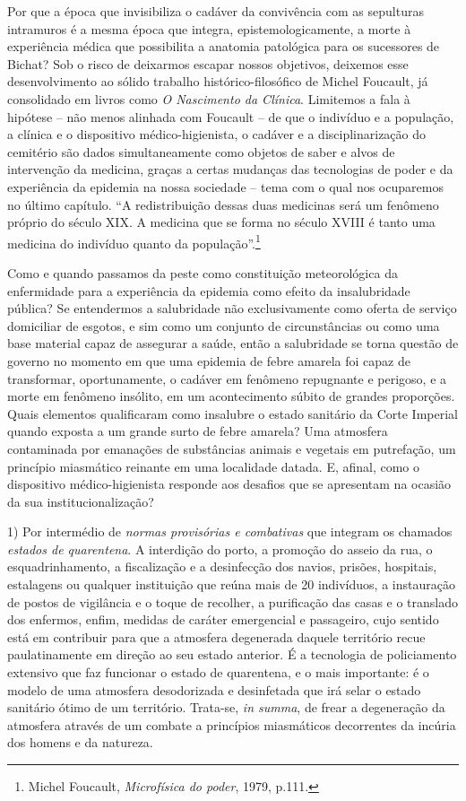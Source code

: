 Por que a época que invisibiliza o cadáver da convivência com as
sepulturas intramuros é a mesma época que integra, epistemologicamente,
a morte à experiência médica que possibilita a anatomia patológica para
os sucessores de Bichat? Sob o risco de deixarmos escapar nossos
objetivos, deixemos esse desenvolvimento ao sólido trabalho
histórico-filosófico de Michel Foucault, já consolidado em livros como
\emph{O Nascimento da Clínica}. Limitemos a fala à hipótese -- não menos
alinhada com Foucault -- de que o indivíduo e a população, a clínica e o
dispositivo médico-higienista, o cadáver e a disciplinarização do
cemitério são dados simultaneamente como objetos de saber e alvos de
intervenção da medicina, graças a certas mudanças das tecnologias de
poder e da experiência da epidemia na nossa sociedade -- tema com o qual
nos ocuparemos no último capítulo. ``A redistribuição dessas duas
medicinas será um fenômeno próprio do século XIX. A medicina que se
forma no século XVIII é tanto uma medicina do indivíduo quanto da
população''.\footnote{Michel Foucault, \emph{Microfísica do poder},
  1979, p.111.}

Como e quando passamos da peste como constituição meteorológica da
enfermidade para a experiência da epidemia como efeito da insalubridade
pública? Se entendermos a salubridade não exclusivamente como oferta de
serviço domiciliar de esgotos, e sim como um conjunto de circunstâncias
ou como uma base material capaz de assegurar a saúde, então a
salubridade se torna questão de governo no momento em que uma epidemia
de febre amarela foi capaz de transformar, oportunamente, o cadáver em
fenômeno repugnante e perigoso, e a morte em fenômeno insólito, em um
acontecimento súbito de grandes proporções. Quais elementos qualificaram
como insalubre o estado sanitário da Corte Imperial quando exposta a um
grande surto de febre amarela? Uma atmosfera contaminada por emanações
de substâncias animais e vegetais em putrefação, um princípio miasmático
reinante em uma localidade datada. E, afinal, como o dispositivo
médico-higienista responde aos desafios que se apresentam na ocasião da
sua institucionalização?

1) Por intermédio de \emph{normas provisórias e combativas} que integram
os chamados \emph{estados de quarentena}. A interdição do porto, a
promoção do asseio da rua, o esquadrinhamento, a fiscalização e a
desinfecção dos navios, prisões, hospitais, estalagens ou qualquer
instituição que reúna mais de 20 indivíduos, a instauração de postos de
vigilância e o toque de recolher, a purificação das casas e o translado
dos enfermos, enfim, medidas de caráter emergencial e passageiro, cujo
sentido está em contribuir para que a atmosfera degenerada daquele
território recue paulatinamente em direção ao seu estado anterior. É a
tecnologia de policiamento extensivo que faz funcionar o estado de
quarentena, e o mais importante: é o modelo de uma atmosfera
desodorizada e desinfetada que irá selar o estado sanitário ótimo de um
território. Trata-se, \emph{in summa}, de frear a degeneração da
atmosfera através de um combate a princípios miasmáticos decorrentes da
incúria dos homens e da natureza.

